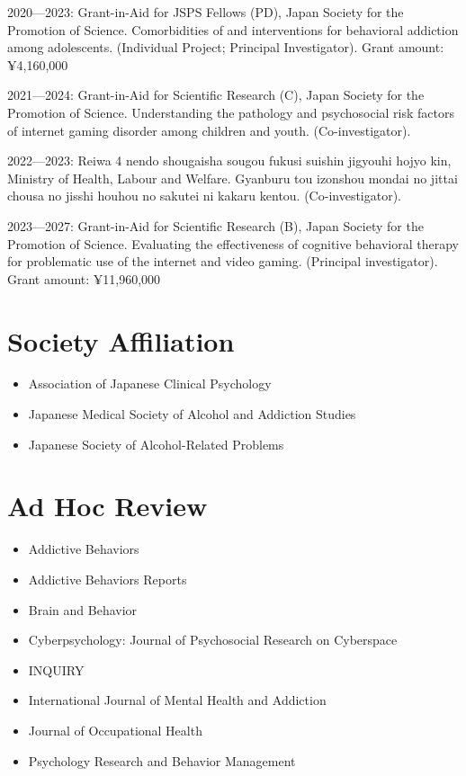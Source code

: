 \documentclass[a4paper]{article}
\begin{document}
\begin{description}
	\item 2020---2023: Grant-in-Aid for JSPS Fellows (PD), Japan Society for the Promotion of Science. Comorbidities of and interventions for behavioral addiction among adolescents. (Individual Project; Principal Investigator). Grant amount: ¥4,160,000
	\item 2021---2024: Grant-in-Aid for Scientific Research (C), Japan Society for the Promotion of Science. Understanding the pathology and psychosocial risk factors of internet gaming disorder among children and youth. (Co-investigator).
	\item 2022---2023: Reiwa 4 nendo shougaisha sougou fukusi suishin jigyouhi hojyo kin, Ministry of Health, Labour and Welfare. Gyanburu tou izonshou mondai no jittai chousa no jisshi houhou no sakutei ni kakaru kentou. (Co-investigator).
	\item 2023---2027: Grant-in-Aid for Scientific Research (B), Japan Society for the Promotion of Science. Evaluating the effectiveness of cognitive behavioral therapy for problematic use of the internet and video gaming. (Principal investigator). Grant amount: ¥11,960,000
	\end{description}

\section{Society Affiliation}
\begin{itemize}
	\item Association of Japanese Clinical Psychology
	\item Japanese Medical Society of Alcohol and Addiction Studies
	\item Japanese Society of Alcohol-Related Problems
\end{itemize}

\section{Ad Hoc Review}
\begin{itemize}
	\item Addictive Behaviors
	\item Addictive Behaviors Reports
	\item Brain and Behavior
	\item Cyberpsychology: Journal of Psychosocial Research on Cyberspace 
	\item INQUIRY
	\item International Journal of Mental Health and Addiction
	\item Journal of Occupational Health
	\item Psychology Research and Behavior Management 
\end{itemize}
\end{document}
